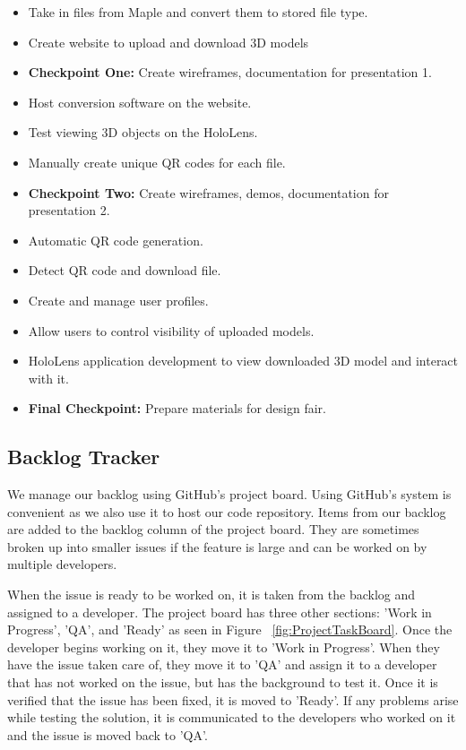 \begin{itemize}
\item Take in files from Maple and convert them to stored file type.
\item Create website to upload and download 3D models
\item \textbf{Checkpoint One:} Create wireframes, documentation for presentation 1.
\item Host conversion software on the website.
\item Test viewing 3D objects on the HoloLens.
\item Manually create unique QR codes for each file. 
\item \textbf{Checkpoint Two:} Create wireframes, demos, documentation for presentation 
2.
\item Automatic QR code generation.
\item Detect QR code and download file.
\item Create and manage user profiles.
\item Allow users to control visibility of uploaded models.
\item HoloLens application development to view downloaded 3D model and interact 
with it.
\item \textbf{Final Checkpoint:} Prepare materials for design fair.
\end{itemize}

\subsection{Backlog Tracker}

We manage our backlog using GitHub's project board. Using GitHub's system is 
convenient as we also use it to host our code repository. Items from our backlog 
are added to the backlog column of the project board. They are sometimes broken 
up into smaller issues if the feature is large and can be worked on by multiple 
developers.

When the issue is ready to be worked on, it is taken from the backlog and 
assigned to a developer. The project board has three other sections: 
'Work in Progress', 'QA', and 'Ready' as seen in Figure 
~\ref{fig:ProjectTaskBoard}. Once the developer begins working on it, 
they move it to 'Work in Progress'. When they have the issue taken care of, they
move it to 'QA' and assign it to a developer that has not worked on the issue, 
but has the background to test it. Once it is verified that the issue has been 
fixed, it is moved to 'Ready'. If any problems arise while testing the solution,
it is communicated to the developers who worked on it and the issue is moved 
back to 'QA'.

